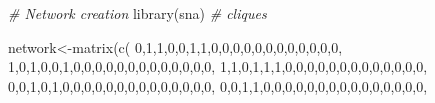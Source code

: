 \documentclass[
  notitlepage,
  onecolumn,
  openany]{book}
\newenvironment{Shaded}{\begin{snugshade}}{\end{snugshade}}
\newcommand{\CommentTok}[1]{\textcolor[rgb]{0.56,0.35,0.01}{\textit{#1}}}
\newcommand{\DecValTok}[1]{\textcolor[rgb]{0.00,0.00,0.81}{#1}}
\newcommand{\FunctionTok}[1]{\textcolor[rgb]{0.00,0.00,0.00}{#1}}
\newcommand{\NormalTok}[1]{#1}
\newcommand{\OtherTok}[1]{\textcolor[rgb]{0.56,0.35,0.01}{#1}}
\begin{document}
\begin{Shaded}
\begin{Highlighting}[]
\CommentTok{\# Network creation}
\FunctionTok{library}\NormalTok{(sna)}
\CommentTok{\# cliques}

\NormalTok{network}\OtherTok{\textless{}{-}}\FunctionTok{matrix}\NormalTok{(}\FunctionTok{c}\NormalTok{(}
\DecValTok{0}\NormalTok{,}\DecValTok{1}\NormalTok{,}\DecValTok{1}\NormalTok{,}\DecValTok{0}\NormalTok{,}\DecValTok{0}\NormalTok{,}\DecValTok{1}\NormalTok{,}\DecValTok{1}\NormalTok{,}\DecValTok{0}\NormalTok{,}\DecValTok{0}\NormalTok{,}\DecValTok{0}\NormalTok{,}\DecValTok{0}\NormalTok{,}\DecValTok{0}\NormalTok{,}\DecValTok{0}\NormalTok{,}\DecValTok{0}\NormalTok{,}\DecValTok{0}\NormalTok{,}\DecValTok{0}\NormalTok{,}\DecValTok{0}\NormalTok{,}\DecValTok{0}\NormalTok{,}\DecValTok{0}\NormalTok{,}
\DecValTok{1}\NormalTok{,}\DecValTok{0}\NormalTok{,}\DecValTok{1}\NormalTok{,}\DecValTok{0}\NormalTok{,}\DecValTok{0}\NormalTok{,}\DecValTok{1}\NormalTok{,}\DecValTok{0}\NormalTok{,}\DecValTok{0}\NormalTok{,}\DecValTok{0}\NormalTok{,}\DecValTok{0}\NormalTok{,}\DecValTok{0}\NormalTok{,}\DecValTok{0}\NormalTok{,}\DecValTok{0}\NormalTok{,}\DecValTok{0}\NormalTok{,}\DecValTok{0}\NormalTok{,}\DecValTok{0}\NormalTok{,}\DecValTok{0}\NormalTok{,}\DecValTok{0}\NormalTok{,}\DecValTok{0}\NormalTok{,}
\DecValTok{1}\NormalTok{,}\DecValTok{1}\NormalTok{,}\DecValTok{0}\NormalTok{,}\DecValTok{1}\NormalTok{,}\DecValTok{1}\NormalTok{,}\DecValTok{1}\NormalTok{,}\DecValTok{0}\NormalTok{,}\DecValTok{0}\NormalTok{,}\DecValTok{0}\NormalTok{,}\DecValTok{0}\NormalTok{,}\DecValTok{0}\NormalTok{,}\DecValTok{0}\NormalTok{,}\DecValTok{0}\NormalTok{,}\DecValTok{0}\NormalTok{,}\DecValTok{0}\NormalTok{,}\DecValTok{0}\NormalTok{,}\DecValTok{0}\NormalTok{,}\DecValTok{0}\NormalTok{,}\DecValTok{0}\NormalTok{,}
\DecValTok{0}\NormalTok{,}\DecValTok{0}\NormalTok{,}\DecValTok{1}\NormalTok{,}\DecValTok{0}\NormalTok{,}\DecValTok{1}\NormalTok{,}\DecValTok{0}\NormalTok{,}\DecValTok{0}\NormalTok{,}\DecValTok{0}\NormalTok{,}\DecValTok{0}\NormalTok{,}\DecValTok{0}\NormalTok{,}\DecValTok{0}\NormalTok{,}\DecValTok{0}\NormalTok{,}\DecValTok{0}\NormalTok{,}\DecValTok{0}\NormalTok{,}\DecValTok{0}\NormalTok{,}\DecValTok{0}\NormalTok{,}\DecValTok{0}\NormalTok{,}\DecValTok{0}\NormalTok{,}\DecValTok{0}\NormalTok{,}
\DecValTok{0}\NormalTok{,}\DecValTok{0}\NormalTok{,}\DecValTok{1}\NormalTok{,}\DecValTok{1}\NormalTok{,}\DecValTok{0}\NormalTok{,}\DecValTok{0}\NormalTok{,}\DecValTok{0}\NormalTok{,}\DecValTok{0}\NormalTok{,}\DecValTok{0}\NormalTok{,}\DecValTok{0}\NormalTok{,}\DecValTok{0}\NormalTok{,}\DecValTok{0}\NormalTok{,}\DecValTok{0}\NormalTok{,}\DecValTok{0}\NormalTok{,}\DecValTok{0}\NormalTok{,}\DecValTok{0}\NormalTok{,}\DecValTok{0}\NormalTok{,}\DecValTok{0}\NormalTok{,}\DecValTok{0}\NormalTok{,}

\end{Highlighting}
\end{Shaded}
\end{document}
